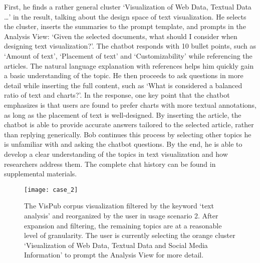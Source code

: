 First, he finds a rather general cluster \textcolor{vis_web_data}{`Visualization of Web Data, Textual Data \dots'} in the result, talking about the design space of text visualization.
He selects the cluster, inserts the summaries to the prompt template, and prompts in the Analysis View: `Given the selected documents, what should I consider when designing text visualization?'.
The chatbot responds with 10 bullet points, such as `Amount of text', `Placement of text' and `Customizability' while referencing the articles.
The natural language explanation with references helps him quickly gain a basic understanding of the topic.
He then proceeds to ask questions in more detail while inserting the full content, such as `What is considered a balanced ratio of text and charts?'.
In the response, one key point that the chatbot emphasizes is that users are found to prefer charts with more textual annotations, as long as the placement of text is well-designed.
By inserting the article, the chatbot is able to provide accurate answers tailored to the selected article, rather than replying generically.
Bob continues this process by selecting other topics he is unfamiliar with and asking the chatbot questions.
By the end, he is able to develop a clear understanding of the topics in text visualization and how researchers address them. 
The complete chat history can be found in supplemental materials.

\begin{figure}%
    \centering
    \texttt{[image: case\_2]}
    \caption{
    The VisPub corpus visualization filtered by the keyword `text analysis' and reorganized by the user in usage scenario 2.
    After expansion and filtering, the remaining topics are at a reasonable level of granularity.
    The user is currently selecting the orange cluster `Visualization of Web Data, Textual Data and Social Media Information' to prompt the Analysis View for more detail.
    }%
    \label{fig: case_2}%
\end{figure}


